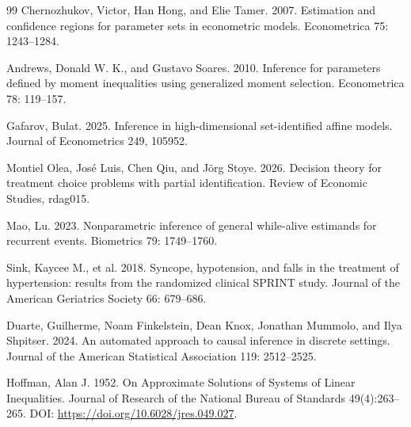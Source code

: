 \documentclass{article}
\begin{document}
\begin{thebibliography}{99}
   Chernozhukov, Victor, Han Hong, and Elie Tamer. 2007. Estimation and confidence regions for parameter sets in econometric models. Econometrica 75: 1243--1284.

   Andrews, Donald W. K., and Gustavo Soares. 2010. Inference for parameters defined by moment inequalities using generalized moment selection. Econometrica 78: 119--157.

   Gafarov, Bulat. 2025. Inference in high-dimensional set-identified affine models. Journal of Econometrics 249, 105952.

   Montiel Olea, José Luis, Chen Qiu, and Jörg Stoye. 2026. Decision theory for treatment choice problems with partial identification. Review of Economic Studies, rdag015.

   Mao, Lu. 2023. Nonparametric inference of general while-alive estimands for recurrent events. Biometrics 79: 1749--1760.

   Sink, Kaycee M., et al. 2018. Syncope, hypotension, and falls in the treatment of hypertension: results from the randomized clinical SPRINT study. Journal of the American Geriatrics Society 66: 679--686.

   Duarte, Guilherme, Noam Finkelstein, Dean Knox, Jonathan Mummolo, and Ilya Shpitser. 2024. An automated approach to causal inference in discrete settings. Journal of the American Statistical Association 119: 2512--2525.

   Hoffman, Alan J. 1952. On Approximate Solutions of Systems of Linear Inequalities. Journal of Research of the National Bureau of Standards 49(4):263--265. DOI: \url{https://doi.org/10.6028/jres.049.027}.

\end{thebibliography}
\end{document}
